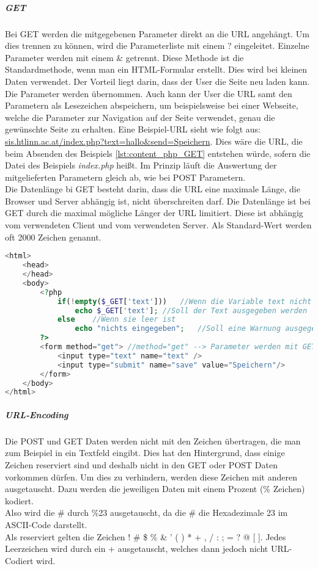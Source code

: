 \subparagraph{GET\\}
Bei GET werden die mitgegebenen Parameter direkt an die URL angehängt. Um dies trennen zu können, wird die Parameterliste mit einem ? eingeleitet. Einzelne Parameter werden mit einem \& getrennt. Diese Methode ist die Standardmethode, wenn man ein HTML-Formular erstellt. Dies wird bei kleinen Daten verwendet. Der Vorteil liegt darin, dass der User die Seite neu laden kann. Die Parameter werden übernommen. Auch kann der User die URL samt den Parametern als Lesezeichen abspeichern, um beispielsweise bei einer Webseite, welche die Parameter zur Navigation auf der Seite verwendet, genau die gewünschte Seite zu erhalten. Eine Beispiel-URL sieht wie folgt aus: \url{sis.htlinn.ac.at/index.php?text=hallo\&send=Speichern}. Dies wäre die URL, die beim Absenden des Beispiels \ref{lst:content_php_GET} entstehen würde, sofern die Datei des Beispiels \textit{index.php} heißt. Im Prinzip läuft die Auswertung der mitgelieferten Parametern gleich ab, wie bei POST Parametern.\\
Die Datenlänge bi GET besteht darin, dass die URL eine maximale Länge, die Browser und Server abhängig ist, nicht überschreiten darf.
Die Datenlänge ist bei GET durch die maximal mögliche Länger der URL limitiert. Diese ist abhängig vom verwendeten Client und vom verwendeten Server. Als Standard-Wert werden oft 2000 Zeichen genannt.
\begin{lstlisting}[style=custom, language=PHP,  caption={Beispiel GET},label={lst:content_php_GET}]
<html>
	<head>
	</head>
	<body>
		<?php
			if(!empty($_GET['text']))	//Wenn die Variable text nicht leer ist
				echo $_GET['text'];	//Soll der Text ausgegeben werden
			else	//Wenn sie leer ist
				echo "nichts eingegeben";	//Soll eine Warnung ausgegeben werden
		?>
		<form method="get">	//method="get" --> Parameter werden mit GET mitgegeben
			<input type="text" name="text" />
			<input type="submit" name="save" value="Speichern"/>
		</form>
	</body>
</html>
\end{lstlisting}
\subparagraph{URL-Encoding\\}
Die POST und GET Daten werden nicht mit den Zeichen übertragen, die man zum Beispiel in ein Textfeld eingibt. Dies hat den Hintergrund, dass einige Zeichen reserviert sind und deshalb nicht in den GET oder POST Daten vorkommen dürfen. Um dies zu verhindern, werden diese Zeichen mit anderen ausgetauscht. Dazu werden die jeweiligen Daten mit einem Prozent (\% Zeichen) kodiert.\\
Also wird die \# durch \%23 ausgetauscht, da die \# die Hexadezimale 23 im ASCII-Code darstellt.\\
Als reserviert gelten die Zeichen ! \# \$ \% \& ' ( ) * + , / : ; = ? @ [ ]. Jedes Leerzeichen wird durch ein + ausgetauscht, welches dann jedoch nicht URL-Codiert wird.
